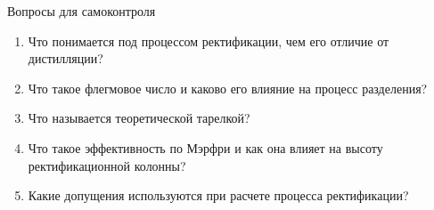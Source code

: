 Вопросы для самоконтроля
\begin{enumerate}
\item Что понимается под процессом ректификации, чем его отличие от дистилляции? 
\item Что такое флегмовое число и каково его влияние на процесс разделения?
\item Что называется теоретической тарелкой?
\item Что такое эффективность по Мэрфри и как она влияет на высоту ректификационной колонны?
\item Какие допущения используются при расчете процесса ректификации?
\end{enumerate}

